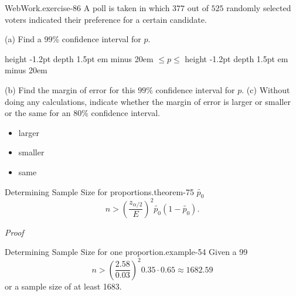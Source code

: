 \documentclass[10pt,]{book}
\makeatletter
\newcommand{\fillin}[1]{\leavevmode\leaders\vrule height -1.2pt depth 1.5pt \hskip #1em minus #1em \null}
\renewcommand*{\proofname}{Proof}
\renewenvironment{proof}[1][\proofname]{\par
  \pushQED{\qed}%
  \normalfont \topsep6\p@\@plus6\p@\relax
  \trivlist
  \item\relax
    {\itshape
    #1\@addpunct{.}}\hspace\labelsep\ignorespaces
}{%
  \popQED\endtrivlist\@endpefalse
}
\numberwithin{equation}{section}
\newcommand{\gt}{>}
\makeatother
\begin{document}
%
\par
\hypertarget{p-1289}{}%
\begin{inlineexercise}{WebWork.}{exercise-86}%
\hypertarget{p-1290}{}%
A poll is taken in which \(377\) out of \(525\) randomly selected voters indicated their preference for a certain candidate.%
\par
\hypertarget{p-1291}{}%
(a) Find a \(99\)\% confidence interval for \(p\).%
\par
\hypertarget{p-1292}{}%
 \fillin{20} \(\leq p \leq\)  \fillin{20}%
\par
\hypertarget{p-1293}{}%
(b) Find the margin of error for this \(99\)\% confidence interval for \(p\).%
\hypertarget{p-1295}{}%
(c) Without doing any calculations, indicate whether the margin of error is larger or smaller or the same for an 80\% confidence interval. \par
\begin{itemize}[label=$\odot$,leftmargin=3em,]
\item{}\hypertarget{p-1296}{}%
larger%

\item{}\hypertarget{p-1297}{}%
smaller%

\item{}\hypertarget{p-1298}{}%
same%

\end{itemize}
%
\end{inlineexercise}
%
\begin{theorem}{Determining Sample Size for proportions.}{}{theorem-75}%
\(\tilde{p_0}\)%
\begin{equation*}
n \gt \left ( \frac{z_{\alpha /2}}{E} \right )^2 \tilde{p_0}(1-\tilde{p_0}).
\end{equation*}
\end{theorem}
\begin{proof}\hypertarget{proof-73}{}
\end{proof}
\begin{example}{Determining Sample Size for one proportion.}{example-54}%
\hypertarget{p-1299}{}%
Given a 99%
\begin{equation*}
n \gt \left ( \frac{2.58}{0.03} \right )^2 0.35 \cdot 0.65 \approx 1682.59
\end{equation*}
or a sample size of at least 1683.%
\end{example}
\hypertarget{p-1300}{}%
\end{document}
